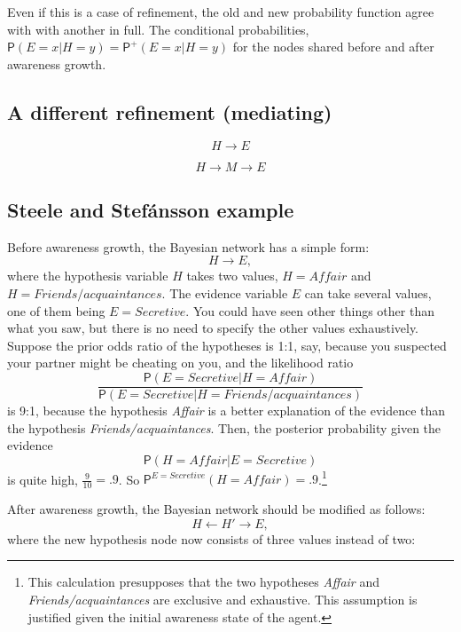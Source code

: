 \documentclass[
  11pt,
  dvipsnames,enabledeprecatedfontcommands]{scrartcl}
\newcommand{\pr}[1]{\ensuremath{\mathsf{P}(#1)}}
\newcommand{\ppr}[2]{\ensuremath{\mathsf{P}^{#1}(#2)}}
\begin{document}
Even if this is a case of
refinement, the old and new
probability function agree with with another in full. The conditional
probabilities, \(\pr{E=x \vert H=y}=\ppr{+}{E=x \vert H=y}\) for the
nodes shared before and after awareness growth.

\hypertarget{a-different-refinement-mediating}{%
\subsection{A different refinement
(mediating)}\label{a-different-refinement-mediating}}

\[H\rightarrow E\]

\[H\rightarrow M \rightarrow E\]

\hypertarget{steele-and-stefuxe1nsson-example}{%
\subsection{Steele and Stefánsson
example}\label{steele-and-stefuxe1nsson-example}}

Before awareness growth, the Bayesian network has a simple form:
\[H \rightarrow E,\] where the hypothesis variable \(H\) takes two
values, \(H=\textit{Affair}\) and \(H=\textit{Friends/acquaintances}\).
The evidence variable \(E\) can take several values, one of them being
\(E=\textit{Secretive}\). You could have seen other things other than
what you saw, but there is no need to specify the other values
exhaustively. Suppose the prior odds ratio of the hypotheses is 1:1,
say, because you suspected your partner might be cheating on you, and
the likelihood ratio
\[\frac{\pr{E=\textit{Secretive}\vert H=\textit{Affair}}}{\pr{E=\textit{Secretive}\vert H=\textit{Friends/acquaintances}}}\]
is 9:1, because the hypothesis \textit{Affair} is a better explanation
of the evidence than the hypothesis \textit{Friends/acquaintances}.
Then, the posterior probability given the evidence
\[\pr{H=\textit{Affair} \vert E=\textit{Secretive}}\] is quite high,
\(\frac{9}{10}=.9\). So
\(\ppr{E=\textit{Secretive}}{H=\textit{Affair}}=.9\).\footnote{This
  calculation presupposes that the two hypotheses \textit{Affair} and
  \textit{Friends/acquaintances} are exclusive and exhaustive. This
  assumption is justified given the initial awareness state of the
  agent.}

After awareness growth, the Bayesian network should be modified as
follows: \[H \leftarrow H' \rightarrow E,\] where the new hypothesis
node now consists of three values instead of two:
\end{document}

